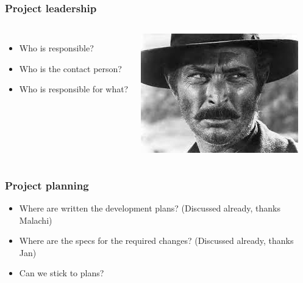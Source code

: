 \documentclass[14pt]{beamer}
\begin{document}
\begin{frame}
\frametitle{Project leadership}
\begin{columns}
\begin{itemize}
\item Who is responsible?
\item Who is the contact person?
\item Who is responsible for what?
\end{itemize}
\includegraphics[width=\textwidth]{bad.jpeg}
\end{columns}
\end{frame}

\begin{frame}
\frametitle{Project planning}
\begin{itemize}
\item Where are written the development plans? (Discussed already, thanks Malachi)
\item Where are the specs for the required changes? (Discussed already, thanks Jan)
\item Can we stick to plans?
\end{itemize}
\end{frame}
\end{document}
